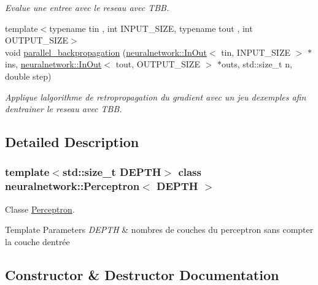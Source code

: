 \begin{DoxyCompactItemize}
\begin{DoxyCompactList}\small\item\em Evalue une entree avec le reseau avec T\+BB. \end{DoxyCompactList}\item 
{\footnotesize template$<$typename tin , int I\+N\+P\+U\+T\+\_\+\+S\+I\+ZE, typename tout , int O\+U\+T\+P\+U\+T\+\_\+\+S\+I\+ZE$>$ }\\void \mbox{\hyperlink{classneuralnetwork_1_1_perceptron_a0f2a106043e5febb19e0d18a94e32dcc}{parallel\+\_\+backpropagation}} (\mbox{\hyperlink{_perceptron_8hpp_a1df3992453d71de615dab4ca5eadba8d}{neuralnetwork\+::\+In\+Out}}$<$ tin, I\+N\+P\+U\+T\+\_\+\+S\+I\+ZE $>$ $\ast$ins, \mbox{\hyperlink{_perceptron_8hpp_a1df3992453d71de615dab4ca5eadba8d}{neuralnetwork\+::\+In\+Out}}$<$ tout, O\+U\+T\+P\+U\+T\+\_\+\+S\+I\+ZE $>$ $\ast$outs, std\+::size\+\_\+t n, double step)
\begin{DoxyCompactList}\small\item\em Applique l\textquotesingle{}algorithme de retropropagation du gradient avec un jeu d\textquotesingle{}exemples afin d\textquotesingle{}entrainer le reseau avec T\+BB. \end{DoxyCompactList}\end{DoxyCompactItemize}


\subsection{Detailed Description}
\subsubsection*{template$<$std\+::size\+\_\+t D\+E\+P\+TH$>$\newline
class neuralnetwork\+::\+Perceptron$<$ D\+E\+P\+T\+H $>$}

Classe \mbox{\hyperlink{classneuralnetwork_1_1_perceptron}{Perceptron}}. 


\begin{DoxyTemplParams}{Template Parameters}
{\em D\+E\+P\+TH} & nombres de couches du perceptron sans compter la couche d\textquotesingle{}entrée \\
\hline
\end{DoxyTemplParams}


\subsection{Constructor \& Destructor Documentation}
\mbox{\label{classneuralnetwork_1_1_perceptron_a611ca300c9ad690d3d9496ed8f6634af}} 
